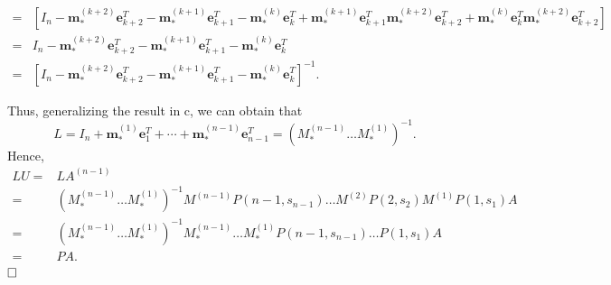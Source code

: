 \documentclass[11pt]{article}
\begin{document}
\begin{enumerate}
\begin{align*}
        =&\left[ I_{n}-\boldsymbol{m}_{*}^{(k+2)} \boldsymbol{e}_{k+2}^{T}-\boldsymbol{m}_{*}^{(k+1)} \boldsymbol{e}_{k+1}^{T}- \boldsymbol{m}_{*}^{(k)} \boldsymbol{e}_{k}^{T} +\boldsymbol{m}_{*}^{(k+1)} \boldsymbol{e}_{k+1}^{T}\boldsymbol{m}_{*}^{(k+2)} \boldsymbol{e}_{k+2}^{T}+\boldsymbol{m}_{*}^{(k)} \boldsymbol{e}_{k}^{T}\boldsymbol{m}_{*}^{(k+2)} \boldsymbol{e}_{k+2}^{T} \right]\\ 
        =& I_{n}-\boldsymbol{m}_{*}^{(k+2)} \boldsymbol{e}_{k+2}^{T}-\boldsymbol{m}_{*}^{(k+1)} \boldsymbol{e}_{k+1}^{T}- \boldsymbol{m}_{*}^{(k)} \boldsymbol{e}_{k}^{T} \\ 
        =&\left[ I_{n}-\boldsymbol{m}_{*}^{(k+2)} \boldsymbol{e}_{k+2}^{T}-\boldsymbol{m}_{*}^{(k+1)} \boldsymbol{e}_{k+1}^{T}- \boldsymbol{m}_{*}^{(k)} \boldsymbol{e}_{k}^{T} \right]^{-1}.
    \end{align*}
    \par Thus, generalizing the result in c, we can obtain that $$L=I_{n}+\boldsymbol{m}_{*}^{(1)} \boldsymbol{e}_{1}^{T}+\cdots+\boldsymbol{m}_{*}^{(n-1)} \boldsymbol{e}_{n-1}^{T}=\left(M_{*}^{(n-1)}\ldots M_{*}^{(1)}\right)^{-1}.$$ Hence,
    \begin{align*}
        LU=&L A^{(n-1)}\\ 
        =&\left(M_{*}^{(n-1)}\ldots M_{*}^{(1)}\right)^{-1} M^{(n-1)} P\left(n-1, s_{n-1}\right) \ldots M^{(2)} P\left(2, s_{2}\right) M^{(1)} P\left(1, s_{1}\right) A\\ 
        =&\left(M_{*}^{(n-1)}\ldots M_{*}^{(1)}\right)^{-1} M_{*}^{(n-1)} \ldots M_{*}^{(1)} P\left(n-1, s_{n-1}\right) \ldots P\left(1, s_{1}\right) A\\ 
        =&PA.
    \end{align*}
    $\hfill\square$
\end{enumerate}
\end{document}
